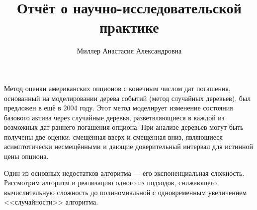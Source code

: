\documentclass[specialist,
               substylefile = spbu.rtx,
               subf,href,colorlinks=true, 12pt]{disser}
\begin{document}


\title{Отчёт о научно-исследовательской практике}


\author{Миллер Анастасия Александровна}


\date{\number\year}

\maketitle










\tableofcontents

\intro
	\par Метод оценки американских опционов с конечным числом дат погашения, основанный на моделировании дерева событий (метод случайных деревьев), был предложен в  ещё в 2004 году. Этот метод моделирует изменение состояния базового актива через случайные деревья, разветвляющиеся в каждой из возможных дат раннего погашения опциона. При анализе деревьев могут быть получены две оценки: смещённая вверх и смещённая вниз, являющиеся асимптотически несмещёнными и дающие доверительный интервал для истинной цены опциона. 
	\par Один из основных недостатков алгоритма --- его экспоненциальная сложность. Рассмотрим алгоритм и реализацию одного из подходов, снижающего вычислительную сложность до полиномиальной с одновременным увеличением <<случайности>> алгоритма.
\end{document}
